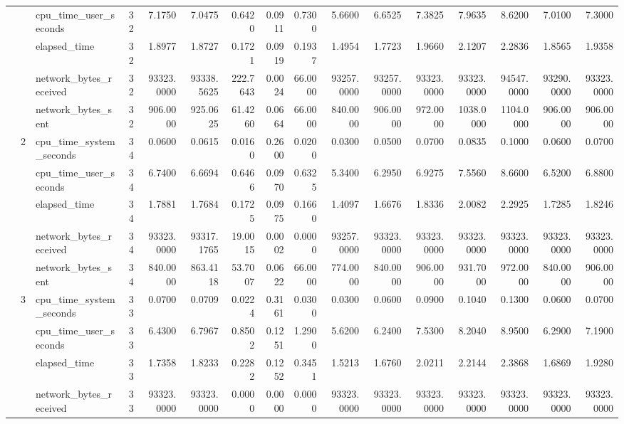 \begin{tabular}{lllrrrrrrrrrrrrr}
 &  & cpu\_time\_user\_seconds & 32 & 7.1750 & 7.0475 & 0.6420 & 0.0911 & 0.7300 & 5.6600 & 6.6525 & 7.3825 & 7.9635 & 8.6200 & 7.0100 & 7.3000 \\
 &  & elapsed\_time & 32 & 1.8977 & 1.8727 & 0.1721 & 0.0919 & 0.1937 & 1.4954 & 1.7723 & 1.9660 & 2.1207 & 2.2836 & 1.8565 & 1.9358 \\
 &  & network\_bytes\_received & 32 & 93323.0000 & 93338.5625 & 222.7643 & 0.0024 & 66.0000 & 93257.0000 & 93257.0000 & 93323.0000 & 93323.0000 & 94547.0000 & 93290.0000 & 93323.0000 \\
 &  & network\_bytes\_sent & 32 & 906.0000 & 925.0625 & 61.4260 & 0.0664 & 66.0000 & 840.0000 & 906.0000 & 972.0000 & 1038.0000 & 1104.0000 & 906.0000 & 906.0000 \\
\cline{2-16}
 & \multirow[t]{5}{*}{2} & cpu\_time\_system\_seconds & 34 & 0.0600 & 0.0615 & 0.0160 & 0.2600 & 0.0200 & 0.0300 & 0.0500 & 0.0700 & 0.0835 & 0.1000 & 0.0600 & 0.0700 \\
 &  & cpu\_time\_user\_seconds & 34 & 6.7400 & 6.6694 & 0.6466 & 0.0970 & 0.6325 & 5.3400 & 6.2950 & 6.9275 & 7.5560 & 8.6600 & 6.5200 & 6.8800 \\
 &  & elapsed\_time & 34 & 1.7881 & 1.7684 & 0.1725 & 0.0975 & 0.1660 & 1.4097 & 1.6676 & 1.8336 & 2.0082 & 2.2925 & 1.7285 & 1.8246 \\
 &  & network\_bytes\_received & 34 & 93323.0000 & 93317.1765 & 19.0015 & 0.0002 & 0.0000 & 93257.0000 & 93323.0000 & 93323.0000 & 93323.0000 & 93323.0000 & 93323.0000 & 93323.0000 \\
 &  & network\_bytes\_sent & 34 & 840.0000 & 863.4118 & 53.7007 & 0.0622 & 66.0000 & 774.0000 & 840.0000 & 906.0000 & 931.7000 & 972.0000 & 840.0000 & 906.0000 \\
\cline{2-16}
 & \multirow[t]{5}{*}{3} & cpu\_time\_system\_seconds & 33 & 0.0700 & 0.0709 & 0.0224 & 0.3161 & 0.0300 & 0.0300 & 0.0600 & 0.0900 & 0.1040 & 0.1300 & 0.0600 & 0.0700 \\
 &  & cpu\_time\_user\_seconds & 33 & 6.4300 & 6.7967 & 0.8502 & 0.1251 & 1.2900 & 5.6200 & 6.2400 & 7.5300 & 8.2040 & 8.9500 & 6.2900 & 7.1900 \\
 &  & elapsed\_time & 33 & 1.7358 & 1.8233 & 0.2282 & 0.1252 & 0.3451 & 1.5213 & 1.6760 & 2.0211 & 2.2144 & 2.3868 & 1.6869 & 1.9280 \\
 &  & network\_bytes\_received & 33 & 93323.0000 & 93323.0000 & 0.0000 & 0.0000 & 0.0000 & 93323.0000 & 93323.0000 & 93323.0000 & 93323.0000 & 93323.0000 & 93323.0000 & 93323.0000 \\

\end{tabular}

